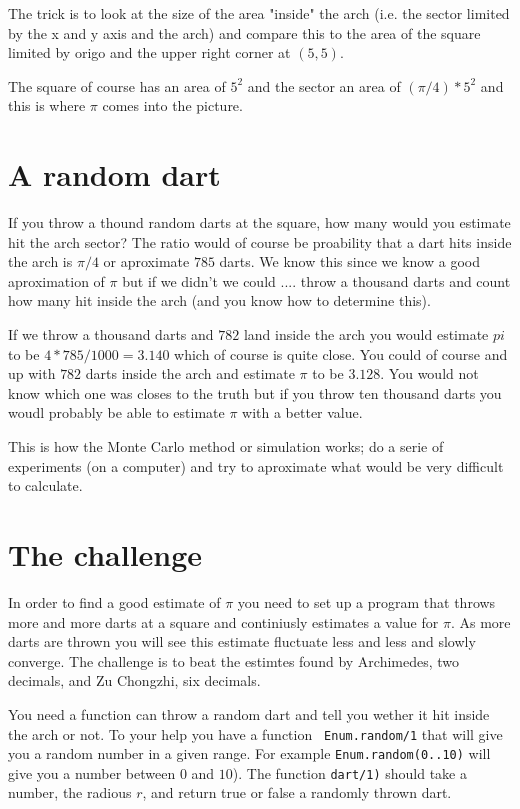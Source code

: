 \documentclass[a4paper,11pt]{article}
\begin{document}
The trick is to look at the size of the area "inside" the arch
(i.e. the sector limited by the x and y axis and the arch) and compare this to
the area of the square limited by origo and the upper right corner at
$(5,5)$.

The square of course has an area of $5^2$ and the sector an area of
$(\pi/4) * 5^2$ and this is where $\pi$ comes into the picture.

\section*{A random dart}

If you throw a thound random darts at the square, how many would you
estimate hit the arch sector? The ratio would of course be proability
that a dart hits inside the arch is $\pi/4$ or aproximate $785$
darts. We know this since we know a good aproximation of $\pi$ but if
we didn't we could .... throw a thousand darts and count how many hit
inside the arch (and you know how to determine this).

If we throw a thousand darts and $782$ land inside the arch you would
estimate $pi$ to be $4*785/1000 = 3.140$ which of course is quite
close. You could of course and up with $782$ darts inside the arch and
estimate $\pi$ to be $3.128$. You would not know which one was closes
to the truth but if you throw ten thousand darts you woudl probably be
able to estimate $\pi$ with a better value.

This is how the Monte Carlo method or simulation works; do a serie of
experiments (on a computer) and try to aproximate what would be very
difficult to calculate. 

\section*{The challenge}


In order to find a good estimate of $\pi$ you need to set up a program
that throws more and more darts at a square and continiusly estimates
a value for $\pi$. As more darts are thrown you will see this estimate
fluctuate less and less and slowly converge. The challenge is to beat
the estimtes found by Archimedes, two decimals, and Zu Chongzhi, six
decimals.

You need a function can throw a random dart and tell you wether it hit
inside the arch or not. To your help you have a function {\tt
  Enum.random/1} that will give you a random number in a given
range. For example {\tt Enum.random(0..10)} will give you a number
between $0$ and $10$).  The function {\tt dart/1)} should take a
number, the radious $r$, and return true or false a randomly thrown
dart.
\end{document}
